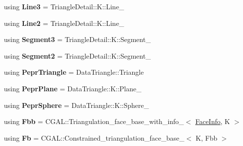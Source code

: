 \begin{DoxyCompactItemize}
\item 
\mbox{\label{classpepr3d_1_1_triangle_detail_abedc3bea984b7db652cb05453bec6ee8}} 
using {\bfseries Line3} = Triangle\+Detail\+::\+K\+::\+Line\+\_
\item 
\mbox{\label{classpepr3d_1_1_triangle_detail_a6b06b451a0da04ecbc856b7f47fbeb25}} 
using {\bfseries Line2} = Triangle\+Detail\+::\+K\+::\+Line\+\_
\item 
\mbox{\label{classpepr3d_1_1_triangle_detail_ab0d804fda63bc0e77791140b7aa0f5b8}} 
using {\bfseries Segment3} = Triangle\+Detail\+::\+K\+::\+Segment\+\_
\item 
\mbox{\label{classpepr3d_1_1_triangle_detail_a198d39df083f914a5885befc81ae9220}} 
using {\bfseries Segment2} = Triangle\+Detail\+::\+K\+::\+Segment\+\_
\item 
\mbox{\label{classpepr3d_1_1_triangle_detail_aca7cfbf857504802dd7e5de02c107565}} 
using {\bfseries Pepr\+Triangle} = Data\+Triangle\+::\+Triangle
\item 
\mbox{\label{classpepr3d_1_1_triangle_detail_a09abf37409b283619fb5448bbdd08e7d}} 
using {\bfseries Pepr\+Plane} = Data\+Triangle\+::\+K\+::\+Plane\+\_
\item 
\mbox{\label{classpepr3d_1_1_triangle_detail_a19cdbad7a9cc454e6d4a0b9573793278}} 
using {\bfseries Pepr\+Sphere} = Data\+Triangle\+::\+K\+::\+Sphere\+\_
\item 
\mbox{\label{classpepr3d_1_1_triangle_detail_a4966cf22583406b8fe0f171b09ff7fd5}} 
using {\bfseries Fbb} = C\+G\+A\+L\+::\+Triangulation\+\_\+face\+\_\+base\+\_\+with\+\_\+info\+\_$<$ \mbox{\hyperlink{structpepr3d_1_1_triangle_detail_1_1_face_info}{Face\+Info}}, K $>$
\item 
\mbox{\label{classpepr3d_1_1_triangle_detail_a3bfe107a55791ce912d291832f1c3c5f}} 
using {\bfseries Fb} = C\+G\+A\+L\+::\+Constrained\+\_\+triangulation\+\_\+face\+\_\+base\+\_$<$ K, Fbb $>$

\end{DoxyCompactItemize}
